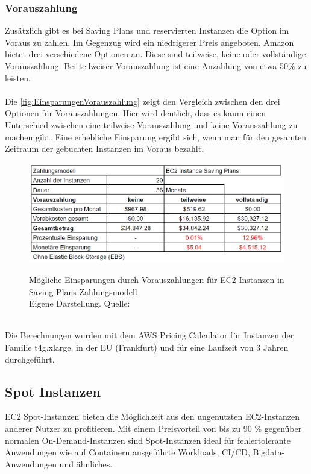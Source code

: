 \subsubsection*{Vorauszahlung}
Zusätzlich gibt es bei Saving Plans und reservierten Instanzen die Option im Voraus zu zahlen. Im Gegenzug wird ein niedrigerer Preis angeboten. Amazon bietet drei verschiedene Optionen an. Diese sind teilweise, keine oder vollständige Vorauszahlung{\cite{AMZ17}}. Bei teilweiser Vorauszahlung ist eine Anzahlung von etwa 50\% zu leisten.
\\\\
Die \autoref{fig:EinsparungenVorauszahlung} zeigt den Vergleich zwischen den drei Optionen für Vorauszahlungen. Hier wird deutlich, dass es kaum einen Unterschied zwischen eine teilweise Vorauszahlung und keine Vorauszahlung zu machen gibt. Eine erhebliche Einsparung ergibt sich, wenn man für den gesamten Zeitraum der gebuchten Instanzen im Voraus bezahlt.
\begin{figure}[h!]
    \centering
    \includegraphics[scale=0.6]{sources/EinsparungenVorauszahlung}\label{fig:EinsparungenVorauszahlung}\\
    \caption[Mögliche Einsparungen durch Vorauszahlungen]{}
    \label{fig:EinsparungenVorauszahlung}Mögliche Einsparungen durch Vorauszahlungen für EC2 Instanzen in Saving Plans Zahlungsmodell\\
    Eigene Darstellung. Quelle: {\cite{AMZ17}}
  \end{figure}
  \\
Die Berechnungen wurden mit dem AWS Pricing Calculator \cite{AMZ17} für Instanzen der Familie t4g.xlarge, in der EU (Frankfurt) und für eine Laufzeit von 3 Jahren durchgeführt. 
\subsection{Spot Instanzen }
EC2 Spot-Instanzen bieten die Möglichkeit aus den ungenutzten EC2-Instanzen anderer Nutzer zu profitieren. 
Mit einem Preisvorteil von bis zu 90 \% gegenüber normalen On-Demand-Instanzen sind Spot-Instanzen ideal für fehlertolerante Anwendungen wie auf Containern ausgeführte Workloads, CI/CD, Bigdata-Anwendungen und ähnliches.

